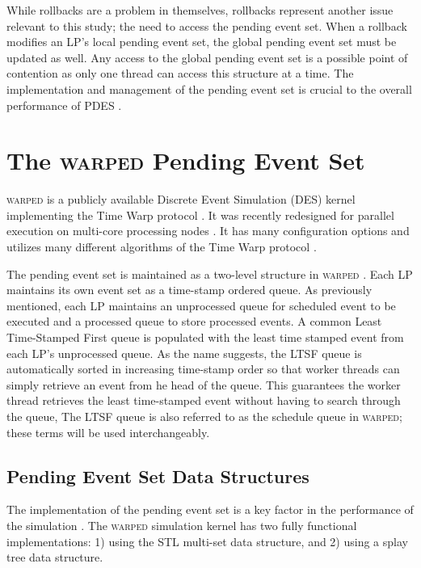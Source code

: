 \documentclass[11pt]{book}
\begin{document}
While rollbacks are a problem in themselves, rollbacks represent another issue relevant to
this study; the need to access the pending event set.  When a rollback modifies an LP's
local pending event set, the global pending event set must be updated as well.  Any access
to the global pending event set is a possible point of contention as only one thread can
access this structure at a time.  The implementation and management of the pending event
set is crucial to the overall performance of PDES \cite{twpes}.

\section{The \textsc{warped} Pending Event Set}

\textsc{warped} is a publicly available Discrete Event Simulation (DES) kernel implementing the
Time Warp protocol \cite{martin,fujimoto}.  It was recently redesigned for parallel
execution on multi-core processing nodes \cite{muthalagu}.  It has many configuration
options and utilizes many different algorithms of the Time Warp protocol \cite{fujimoto}.

The pending event set is maintained as a two-level structure in \textsc{warped} \cite{dickman}.
Each LP maintains its own event set as a time-stamp ordered queue.  As previously
mentioned, each LP maintains an unprocessed queue for scheduled event to be executed and a
processed queue to store processed events.  A common Least Time-Stamped First queue is
populated with the least time stamped event from each LP's unprocessed queue.
As the name suggests, the LTSF queue is automatically sorted in increasing
time-stamp order so that worker threads can simply retrieve an event from he
head of the queue.  This guarantees the worker thread retrieves the least
time-stamped event without having to search through the queue, The LTSF queue is
also referred to as the schedule queue in \textsc{warped}; these terms will be
used interchangeably.

\subsection{Pending Event Set Data Structures}

The implementation of the pending event set is a key factor in the performance of the
simulation \cite{twpes}.  The \textsc{warped} simulation kernel has two fully functional
implementations: 1) using the STL multi-set data structure, and 2) using a splay tree data
structure.
\end{document}
